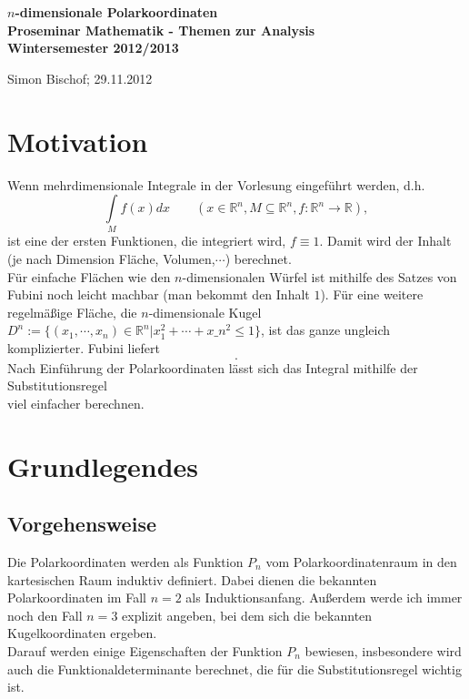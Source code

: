 \documentclass[a4paper,11pt]{report}
\theoremstyle{definition}
\newcommand{\R}{{\ensuremath{\mathbb{R}}}}
\newcommand{\const}{\ensuremath{\equiv}}
\begin{document}
\begin{titlepage}
	\begin{center}	
		\LARGE \textbf{$n$-dimensionale Polarkoordinaten \\[5ex]
			{\Large Proseminar Mathematik - Themen zur Analysis \\[5ex] 
    		Wintersemester 2012/2013}\\[5ex]}
	\end{center}
	\begin{center}
		Simon Bischof; 29.11.2012 %
	\end{center}
\end{titlepage}
\clearpage{}
\setcounter{tocdepth}{1}
\tableofcontents

\clearpage{}
\chapter{Motivation}
Wenn mehrdimensionale Integrale in der Vorlesung eingeführt werden, d.h.
$$\int\limits_M f(x)dx \qquad (x\in\R^n,M\subseteq \R^n, f:\R^n\to\R),$$ %
ist eine der ersten Funktionen, die integriert wird, $f\const 1$. Damit wird der Inhalt (je nach Dimension Fläche, Volumen,$\cdots$) berechnet.\\
Für einfache Flächen wie den $n$-dimensionalen Würfel %
ist mithilfe des Satzes von Fubini noch leicht machbar (man bekommt den Inhalt $1$). Für eine weitere regelmäßige Fläche, die $n$-dimensionale Kugel $D^n:=\{(x_1,\cdots,x_n)\in\R^n|x_1^2+\cdots+x\_n^2\leq 1\}$, ist das ganze ungleich komplizierter. Fubini liefert
$$.$$%
Nach Einführung der Polarkoordinaten lässt sich das Integral mithilfe der Substitutionsregel
$$$$%
viel einfacher berechnen.
\chapter{Grundlegendes}
\section{Vorgehensweise}
Die Polarkoordinaten werden als Funktion $P_n$ vom \glqq Polarkoordinatenraum\grqq{} in den kartesischen Raum induktiv definiert. Dabei dienen die bekannten Polarkoordinaten im Fall $n=2$ als Induktionsanfang. Außerdem werde ich immer noch den Fall $n=3$ explizit angeben, bei dem sich die bekannten Kugelkoordinaten ergeben.\\
Darauf werden einige Eigenschaften der Funktion $P_n$ bewiesen, insbesondere wird auch die Funktionaldeterminante berechnet, die für die Substitutionsregel %
wichtig ist.
\end{document}
